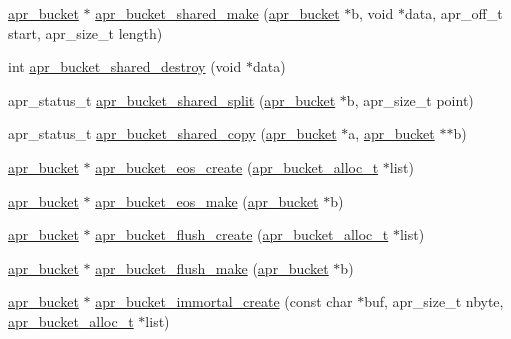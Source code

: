 \begin{DoxyCompactItemize}
\item 
\hyperlink{structapr__bucket}{apr\-\_\-bucket} $\ast$ \hyperlink{group___a_p_r___util___bucket___brigades_ga562251ac5776e88f7384158b85e74be8}{apr\-\_\-bucket\-\_\-shared\-\_\-make} (\hyperlink{structapr__bucket}{apr\-\_\-bucket} $\ast$b, void $\ast$data, apr\-\_\-off\-\_\-t start, apr\-\_\-size\-\_\-t length)
\item 
int \hyperlink{group___a_p_r___util___bucket___brigades_ga43c7dc7e3eb961a91bbc0b69a47e503c}{apr\-\_\-bucket\-\_\-shared\-\_\-destroy} (void $\ast$data)
\item 
apr\-\_\-status\-\_\-t \hyperlink{group___a_p_r___util___bucket___brigades_ga871e54ba20487a2085a73a673ffa4110}{apr\-\_\-bucket\-\_\-shared\-\_\-split} (\hyperlink{structapr__bucket}{apr\-\_\-bucket} $\ast$b, apr\-\_\-size\-\_\-t point)
\item 
apr\-\_\-status\-\_\-t \hyperlink{group___a_p_r___util___bucket___brigades_ga2e9a035d340ef6b4279b178eff614670}{apr\-\_\-bucket\-\_\-shared\-\_\-copy} (\hyperlink{structapr__bucket}{apr\-\_\-bucket} $\ast$a, \hyperlink{structapr__bucket}{apr\-\_\-bucket} $\ast$$\ast$b)
\item 
\hyperlink{structapr__bucket}{apr\-\_\-bucket} $\ast$ \hyperlink{group___a_p_r___util___bucket___brigades_gaac308b459ecdab87e94b12adad1b8760}{apr\-\_\-bucket\-\_\-eos\-\_\-create} (\hyperlink{group___a_p_r___util___bucket___brigades_ga9a30babfeb6e290db124d8f9b69e49e4}{apr\-\_\-bucket\-\_\-alloc\-\_\-t} $\ast$list)
\item 
\hyperlink{structapr__bucket}{apr\-\_\-bucket} $\ast$ \hyperlink{group___a_p_r___util___bucket___brigades_ga06312ba339cb0ec1844b698d30e754c4}{apr\-\_\-bucket\-\_\-eos\-\_\-make} (\hyperlink{structapr__bucket}{apr\-\_\-bucket} $\ast$b)
\item 
\hyperlink{structapr__bucket}{apr\-\_\-bucket} $\ast$ \hyperlink{group___a_p_r___util___bucket___brigades_ga48347f3f7d5738cdb61fe35c25c09666}{apr\-\_\-bucket\-\_\-flush\-\_\-create} (\hyperlink{group___a_p_r___util___bucket___brigades_ga9a30babfeb6e290db124d8f9b69e49e4}{apr\-\_\-bucket\-\_\-alloc\-\_\-t} $\ast$list)
\item 
\hyperlink{structapr__bucket}{apr\-\_\-bucket} $\ast$ \hyperlink{group___a_p_r___util___bucket___brigades_gaee543b95249a320a27ae9bb03e2c4f23}{apr\-\_\-bucket\-\_\-flush\-\_\-make} (\hyperlink{structapr__bucket}{apr\-\_\-bucket} $\ast$b)
\item 
\hyperlink{structapr__bucket}{apr\-\_\-bucket} $\ast$ \hyperlink{group___a_p_r___util___bucket___brigades_gad81543da24b144c0e100dd1e6d843adb}{apr\-\_\-bucket\-\_\-immortal\-\_\-create} (const char $\ast$buf, apr\-\_\-size\-\_\-t nbyte, \hyperlink{group___a_p_r___util___bucket___brigades_ga9a30babfeb6e290db124d8f9b69e49e4}{apr\-\_\-bucket\-\_\-alloc\-\_\-t} $\ast$list)
$$
\end{DoxyCompactItemize}
